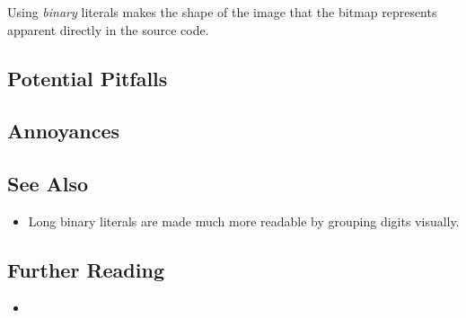 \noindent Using \emph{binary} literals makes the shape of the image that the
bitmap represents apparent directly in the source code.

\subsection[Potential Pitfalls]{Potential Pitfalls}\label{potential-pitfalls}

\hspace*{\fill}

\subsection[Annoyances]{Annoyances}\label{annoyances}

\hspace*{\fill}

\subsection[See Also]{See Also}\label{see-also}

\begin{itemize}
\item{%
Long binary literals are made much more readable by grouping digits visually.}
\end{itemize}

\subsection[Further Reading]{Further Reading}\label{further-reading}

\begin{itemize}
\item{\cite{informit}}
\end{itemize}


